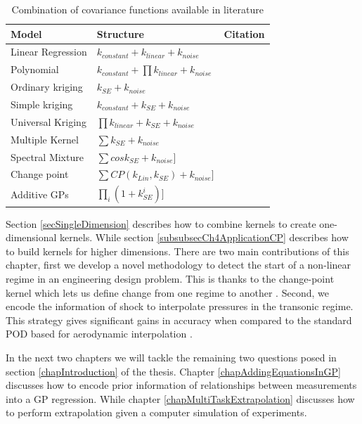 \begin{table}[!ht]
    \centering
\begin{tabularx}{\textwidth}{|l|l|X|}
  \hline
Model  & Structure & Citation \\
  \hline 
  \hline
Linear Regression & \small $k_{constant}+k_{linear}+k_{noise}$ &  \normalsize\\
Polynomial & \small $k_{constant}+\prod k_{linear}+k_{noise}$ &  \normalsize\\
Ordinary kriging & \small $k_{SE} + k_{noise}$ \normalsize &  \cite{krige1951statistical} \\
Simple kriging & \small $k_{constant}+k_{SE} + k_{noise}$ &  \normalsize\\
Universal Kriging & \small $\prod k_{linear}+k_{SE} + k_{noise}$ \normalsize & \cite{matheron1963principles} \\ Multiple Kernel & \small $\sum k_{SE} + k_{noise}$ \normalsize  &  \\
Spectral Mixture & \small  $\sum cos k_{SE} + k_{noise} ]$ \normalsize & \cite{wilson2013gaussian} \\
Change point & \small  $\sum CP(k_{Lin}, k_{SE}) + k_{noise} ]$ \normalsize & \cite{osborne2010bayesian} \\
Additive GPs & \small  $\prod_{i}(1+k^{i}_{SE}) ]$ \normalsize& \cite{duvenaud2011additive} \normalsize\\
   \hline
\end{tabularx}
  \label{tabListOfCombinationOfCovarianceFunctions}
  \caption{Combination of covariance functions available in literature}
  \end{table}

Section \ref{secSingleDimension} describes how to combine kernels to create one-dimensional kernels. While section \ref{subsubsecCh4ApplicationCP} describes how to build kernels for higher dimensions. There are two main contributions of this chapter, first we develop a novel methodology to detect the start of a non-linear regime in an engineering design problem. This is thanks to the change-point kernel which lets us define change from one regime to another \cite{chiplunkar:hal-01555401}. Second, we encode the information of shock to interpolate pressures in the transonic regime. This strategy gives significant gains in accuracy when compared to the standard POD based for aerodynamic interpolation \cite{oatao18004}. 

In the next two chapters we will tackle the remaining two questions posed in section \ref{chapIntroduction} of the thesis. Chapter \ref{chapAddingEquationsInGP} discusses how to encode prior information of relationships between measurements into a GP regression. While chapter \ref{chapMultiTaskExtrapolation} discusses how to perform extrapolation given a computer simulation of experiments. 
